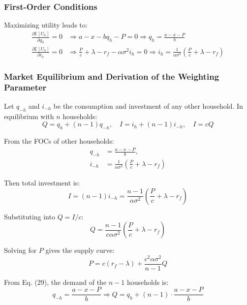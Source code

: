\documentclass[12pt,a4paper]{article}%
\begin{document}
\subsubsection{First-Order Conditions}

Maximizing utility leads to:
\begin{align}
\frac{\partial \mathbb{E}[U_h]}{\partial q_h} = 0 &\Rightarrow a - x - b q_h - P = 0 \Rightarrow q_h = \frac{a - x - P}{b} \\
\frac{\partial \mathbb{E}[U_h]}{\partial i_h} = 0 &\Rightarrow \frac{P}{c} + \lambda - r_f - \alpha \sigma^2 i_h = 0 \Rightarrow i_h = \frac{1}{\alpha \sigma^2}\left( \frac{P}{c} + \lambda - r_f \right) 
\end{align}

\subsubsection{Market Equilibrium and Derivation of the Weighting Parameter}

Let $q_{-h}$ and $i_{-h}$ be the consumption and investment of any other household. In equilibrium with $n$ households:
\begin{equation}
Q = q_h + (n - 1)q_{-h}, \quad I = i_h + (n - 1)i_{-h}, \quad I = cQ 
\end{equation}

From the FOCs of other households:
\begin{align}
q_{-h} &= \frac{a - x - P}{b}, \\
i_{-h} &= \frac{1}{\alpha \sigma^2} \left( \frac{P}{c} + \lambda - r_f \right) 
\end{align}

Then total investment is:
\begin{equation}
I = (n - 1)i_{-h} = \frac{n - 1}{\alpha \sigma^2} \left( \frac{P}{c} + \lambda - r_f \right)
\end{equation}

Substituting into $Q = I/c$:
\begin{equation}
Q = \frac{n - 1}{c \alpha \sigma^2} \left( \frac{P}{c} + \lambda - r_f \right) 
\end{equation}

Solving for $P$ gives the supply curve:
\begin{equation}
P = c(r_f - \lambda) + \frac{c^2 \alpha \sigma^2}{n - 1} Q 
\end{equation}

From Eq. (29), the demand of the $n - 1$ households is:
\begin{equation}
q_{-h} = \frac{a - x - P}{b} \Rightarrow Q = q_h + (n - 1)\cdot \frac{a - x - P}{b} 
\end{equation}
\end{document}
